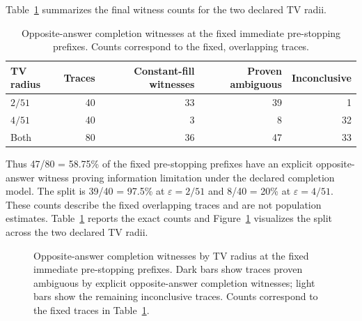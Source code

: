 \documentclass[preprint,11pt]{elsarticle}
\begin{document}
Table~\ref{tab:witnesses} summarizes the final witness counts for the two declared TV radii.
\begin{table}[t]
\centering
\caption{Opposite-answer completion witnesses at the fixed immediate pre-stopping prefixes. Counts correspond to the fixed, overlapping traces.}
\label{tab:witnesses}
\footnotesize
\begin{tabular}{lrrrr}
\toprule
TV radius & Traces & Constant-fill witnesses & Proven ambiguous & Inconclusive\\
\midrule
$2/51$ & 40 & 33 & 39 & 1\\
$4/51$ & 40 & 3 & 8 & 32\\
Both & 80 & 36 & 47 & 33\\
\bottomrule
\end{tabular}
\end{table}

Thus 47/80 = 58.75\% of the fixed pre-stopping prefixes have an explicit opposite-answer witness proving information limitation under the declared completion model. The split is 39/40 = 97.5\% at $\varepsilon=2/51$ and 8/40 = 20\% at $\varepsilon=4/51$. These counts describe the fixed overlapping traces and are not population estimates. Table~\ref{tab:witnesses} reports the exact counts and Figure~\ref{fig:witness_radius} visualizes the split across the two declared TV radii.

\begin{figure}[t]
\centering
{}
\caption{Opposite-answer completion witnesses by TV radius at the fixed immediate pre-stopping prefixes. Dark bars show traces proven ambiguous by explicit opposite-answer completion witnesses; light bars show the remaining inconclusive traces. Counts correspond to the fixed traces in Table~\ref{tab:witnesses}.}
\label{fig:witness_radius}
\end{figure}
\end{document}
